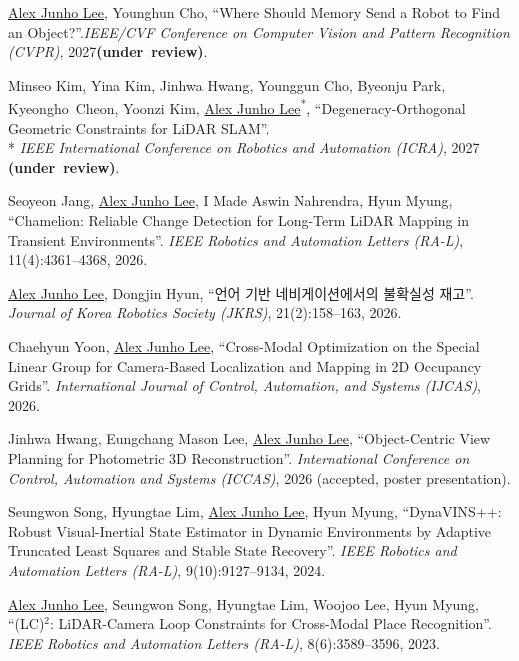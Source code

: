 \documentclass[margin]{res}
\begin{document}
\begin{resume}
		\par \underline{Alex Junho Lee}, Younghun Cho, ``Where Should Memory Send a Robot to Find an Object?''.\newline \textit{IEEE/CVF Conference on Computer Vision and Pattern Recognition (CVPR)}, 2027\newline \mbox{\textbf{(under review)}}.

		\par Minseo Kim, Yina Kim, Jinhwa Hwang, Younggun Cho, Byeonju Park, Kyeongho~Cheon, Yoonzi Kim, \underline{Alex Junho Lee}\textsuperscript{*}, ``Degeneracy-Orthogonal Geometric Constraints for LiDAR SLAM''.\\*
		\textit{IEEE International Conference on Robotics and Automation (ICRA)}, 2027 \mbox{\textbf{(under review)}}.

		\par Seoyeon Jang, \underline{Alex Junho Lee}, I Made Aswin Nahrendra, Hyun Myung, ``Chamelion: Reliable Change Detection for Long-Term LiDAR Mapping in Transient Environments''. \textit{IEEE Robotics and Automation Letters (RA-L)}, 11(4):4361--4368, 2026.

		\par\underline{Alex Junho Lee}, Dongjin Hyun, ``언어 기반 네비게이션에서의 불확실성 재고''. \textit{Journal of Korea Robotics Society (JKRS)}, 21(2):158--163, 2026.

		\par Chaehyun Yoon, \underline{Alex Junho Lee}, ``Cross-Modal Optimization on the Special Linear Group for Camera-Based Localization and Mapping in 2D Occupancy Grids''. \textit{International Journal of Control, Automation, and Systems (IJCAS)}, 2026.

		\par Jinhwa Hwang, Eungchang Mason Lee, \underline{Alex Junho Lee}, ``Object-Centric View Planning for Photometric 3D Reconstruction''. \textit{International Conference on Control, Automation and Systems (ICCAS)}, 2026 (accepted, poster presentation).

		\par Seungwon Song, Hyungtae Lim, \underline{Alex Junho Lee}, Hyun Myung, ``DynaVINS++: Robust Visual-Inertial State Estimator in Dynamic Environments by Adaptive Truncated Least Squares and Stable State Recovery''. \textit{IEEE Robotics and Automation Letters (RA-L)}, 9(10):9127--9134, 2024.

		\par\underline{Alex Junho Lee}, Seungwon Song, Hyungtae Lim, Woojoo Lee, Hyun Myung, ``(LC)$^2$: LiDAR-Camera Loop Constraints for Cross-Modal Place Recognition''. \textit{IEEE Robotics and Automation Letters (RA-L)}, 8(6):3589--3596, 2023.


\end{resume}
\end{document}
